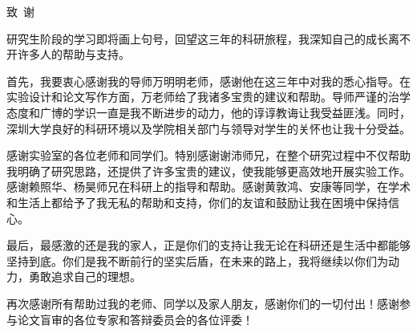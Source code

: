 \begin{szuAppendix}{致~谢}

\songti{}
\setlength{\baselineskip}{23pt}

研究生阶段的学习即将画上句号，回望这三年的科研旅程，我深知自己的成长离不开许多人的帮助与支持。

首先，我要衷心感谢我的导师万明明老师，感谢他在这三年中对我的悉心指导。在实验设计和论文写作方面，万老师给了我诸多宝贵的建议和帮助。导师严谨的治学态度和广博的学识一直是我不断进步的动力，他的谆谆教诲让我受益匪浅。同时，深圳大学良好的科研环境以及学院相关部门与领导对学生的关怀也让我十分受益。

感谢实验室的各位老师和同学们。特别感谢谢沛师兄，在整个研究过程中不仅帮助我明确了研究思路，还提供了许多宝贵的建议，使我能够更高效地开展实验工作。感谢赖照华、杨昊师兄在科研上的指导和帮助。感谢黄敦鸿、安康等同学，在学术和生活上都给予了我无私的帮助和支持，你们的友谊和鼓励让我在困境中保持信心。

最后，最感激的还是我的家人，正是你们的支持让我无论在科研还是生活中都能够坚持到底。你们是我不断前行的坚实后盾，在未来的路上，我将继续以你们为动力，勇敢追求自己的理想。

再次感谢所有帮助过我的老师、同学以及家人朋友，感谢你们的一切付出！感谢参与论文盲审的各位专家和答辩委员会的各位评委！

\end{szuAppendix}

